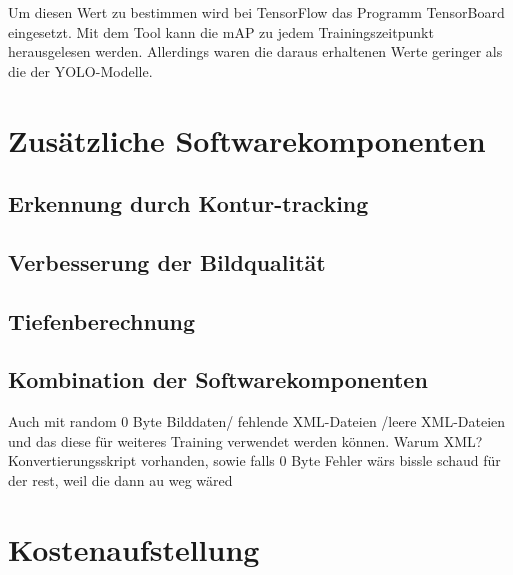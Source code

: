 Um diesen Wert zu bestimmen wird bei TensorFlow das Programm TensorBoard eingesetzt. Mit dem Tool kann die \ac{mAP} zu jedem Trainingszeitpunkt herausgelesen werden. Allerdings waren die daraus erhaltenen Werte geringer als die der \ac{YOLO}-Modelle.

\section{Zusätzliche Softwarekomponenten}

\subsection{Erkennung durch Kontur-tracking}

\subsection{Verbesserung der Bildqualität}

\subsection{Tiefenberechnung} \label{cap:calc_depth}

\subsection{Kombination der Softwarekomponenten}
Auch mit random 0 Byte Bilddaten/ fehlende XML-Dateien /leere XML-Dateien und das diese für weiteres Training verwendet werden können. Warum XML? Konvertierungsskript vorhanden, sowie falls 0 Byte Fehler wärs bissle schaud für der rest, weil die dann au weg wäred
\section{Kostenaufstellung}

